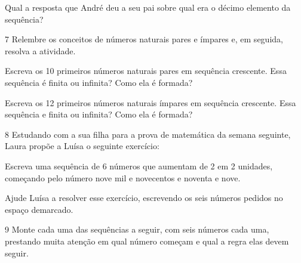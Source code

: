 Qual a resposta que André deu a seu pai sobre qual era o décimo elemento da sequência?


\num{7} Relembre os conceitos de números naturais pares e ímpares e, em
seguida, resolva a atividade.

\begin{escolha}
\item
  Escreva os 10 primeiros números naturais pares em sequência crescente.
  Essa sequência é finita ou infinita? Como ela é formada?


\item
  Escreva os 12 primeiros números naturais ímpares em sequência
  crescente. Essa sequência e finita ou infinita? Como ela é formada?

\end{escolha}

\pagebreak
\num{8} Estudando com a sua filha para a prova de matemática da semana
seguinte, Laura propõe a Luísa o seguinte exercício:

\begin{mdframed}[linewidth=2pt,linecolor=salmao,backgroundcolor=salmao!20]
Escreva uma sequência de 6 números que aumentam de 2 em 2 unidades,
começando pelo número nove mil e novecentos e noventa e nove.
\end{mdframed}

Ajude Luísa a resolver esse exercício, escrevendo os seis números pedidos no espaço demarcado.


\num{9} Monte cada uma das sequências a seguir, com seis números cada uma,
prestando muita atenção em qual número começam e qual a regra elas devem
seguir.

